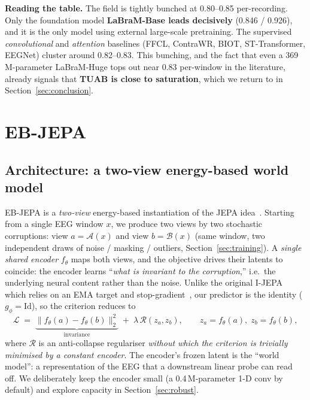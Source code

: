 \documentclass[10pt,a4paper]{article}
\begin{document}
\textbf{Reading the table.} The field is tightly bunched at 0.80--0.85 per-recording. Only the foundation
model \textbf{LaBraM-Base leads decisively} (0.846 / 0.926), and it is the only model using external
large-scale pretraining. The supervised \emph{convolutional} and \emph{attention} baselines (FFCL,
ContraWR, BIOT, ST-Transformer, EEGNet) cluster around 0.82--0.83. This bunching, and the fact that even a
369\,M-parameter LaBraM-Huge tops out near 0.83 per-window in the literature, already signals that
\textbf{TUAB is close to saturation}, which we return to in Section~\ref{sec:conclusion}.

\section{EB-JEPA}
\label{sec:ebjepa}

\subsection{Architecture: a two-view energy-based world model}
\label{sec:arch}

EB-JEPA is a \emph{two-view} energy-based instantiation of the JEPA idea~\cite{ijepa,lecun2022,ebjepa_lib}.
Starting from a single EEG window $x$, we produce two views by two stochastic corruptions: view
$a = \mathcal{A}(x)$ and view $b = \mathcal{B}(x)$ (same window, two independent draws of noise / masking /
outliers, Section~\ref{sec:training}). A \emph{single shared encoder} $f_\theta$ maps both views, and the
objective drives their latents to coincide: the encoder learns ``\emph{what is invariant to the
corruption},'' i.e.\ the underlying neural content rather than the noise. Unlike the original I-JEPA which
relies on an EMA target and stop-gradient~\cite{ijepa}, our predictor is the identity ($g_\phi=\mathrm{Id}$),
so the criterion reduces to
\begin{equation}
\mathcal{L} \;=\; \underbrace{\|f_\theta(a) - f_\theta(b)\|_2^2}_{\text{invariance}} \;+\; \lambda\,\mathcal{R}(z_a, z_b),
\qquad z_a = f_\theta(a),\; z_b = f_\theta(b),
\end{equation}
where $\mathcal{R}$ is an anti-collapse regulariser \emph{without which the criterion is trivially minimised
by a constant encoder}. The encoder's frozen latent is the ``world model'': a representation of the EEG that
a downstream linear probe can read off. We deliberately keep the encoder small (a 0.4\,M-parameter 1-D conv
by default) and explore capacity in Section~\ref{sec:robust}.
\end{document}

